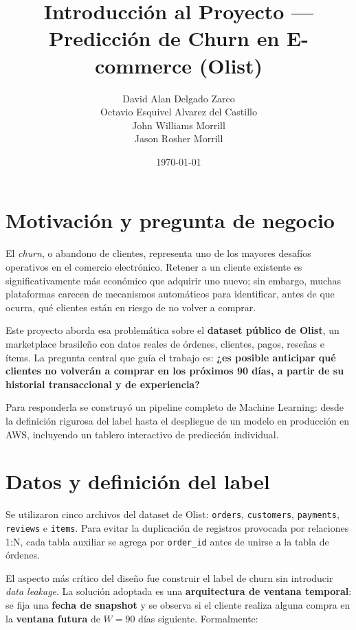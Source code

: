 \documentclass[11pt]{article}
\title{Introducción al Proyecto --- Predicción de Churn en E-commerce (Olist)}
\author{
David Alan Delgado Zarco \\
Octavio Esquivel Alvarez del Castillo \\
John Williams Morrill \\
Jason Rosher Morrill
}
\date{\today}
\begin{document}
\maketitle
\tableofcontents
\newpage

\section{Motivación y pregunta de negocio}

El \textit{churn}, o abandono de clientes, representa uno de los mayores desafíos operativos en el comercio electrónico. Retener a un cliente existente es significativamente más
económico que adquirir uno nuevo; sin embargo, muchas plataformas carecen de mecanismos
automáticos para identificar, antes de que ocurra, qué clientes están en riesgo de no volver a
comprar.

Este proyecto aborda esa problemática sobre el \textbf{dataset público de Olist}, un marketplace
brasileño con datos reales de órdenes, clientes, pagos, reseñas e ítems. La pregunta central
que guía el trabajo es: \textbf{¿es posible anticipar qué clientes no volverán a comprar en los
próximos 90 días, a partir de su historial transaccional y de experiencia?}

Para responderla se construyó un pipeline completo de Machine Learning: desde la definición
rigurosa del label hasta el despliegue de un modelo en producción en AWS, incluyendo un
tablero interactivo de predicción individual.

\section{Datos y definición del label}

Se utilizaron cinco archivos del dataset de Olist: \texttt{orders}, \texttt{customers},
\texttt{payments}, \texttt{reviews} e \texttt{items}. Para evitar la duplicación de registros
provocada por relaciones 1:N, cada tabla auxiliar se agrega por \texttt{order\_id} antes de
unirse a la tabla de órdenes.

El aspecto más crítico del diseño fue construir el label de churn sin introducir
\textit{data leakage}. La solución adoptada es una \textbf{arquitectura de ventana temporal}:
se fija una \textbf{fecha de snapshot} y se observa si el cliente realiza alguna compra en la
\textbf{ventana futura} de $W = 90$ días siguiente. Formalmente:
\end{document}
